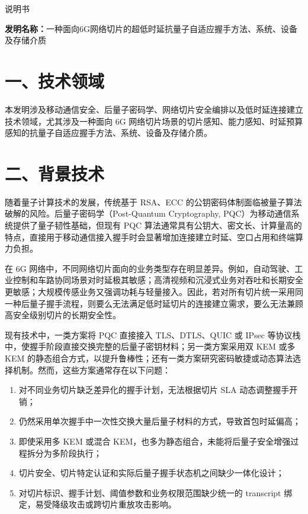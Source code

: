 \documentclass[12pt,a4paper]{article}
\begin{document}
\begin{center}
    {\Huge\heiti 说明书}
\end{center}

\vspace{1em}

\noindent\textbf{发明名称：}一种面向6G网络切片的超低时延抗量子自适应握手方法、系统、设备及存储介质

\section*{一、技术领域}

本发明涉及移动通信安全、后量子密码学、网络切片安全编排以及低时延连接建立技术领域，尤其涉及一种面向 6G 网络切片场景的切片感知、能力感知、时延预算感知的抗量子自适应握手方法、系统、设备及存储介质。

\section*{二、背景技术}

随着量子计算技术的发展，传统基于 RSA、ECC 的公钥密码体制面临被量子算法破解的风险。后量子密码学（Post-Quantum Cryptography, PQC）为移动通信系统提供了量子韧性基础，但现有 PQC 算法通常具有公钥大、密文长、计算量高的特点，直接用于移动通信接入握手时会显著增加连接建立时延、空口占用和终端算力负担。

在 6G 网络中，不同网络切片面向的业务类型存在明显差异。例如，自动驾驶、工业控制和车路协同场景对时延极其敏感；高清视频和沉浸式业务对吞吐和长期安全更敏感；大规模传感业务又强调功耗与轻量接入。因此，若对所有切片统一采用同一种后量子握手流程，则要么无法满足低时延切片的连接建立需求，要么无法兼顾高安全级别切片的长期安全性。

现有技术中，一类方案将 PQC 直接接入 TLS、DTLS、QUIC 或 IPsec 等协议栈中，使握手阶段直接交换完整的后量子密钥材料；另一类方案采用双 KEM 或多 KEM 的静态组合方式，以提升鲁棒性；还有一类方案研究密码敏捷或动态算法选择机制。然而，这些方案通常存在以下问题：

\begin{enumerate}[leftmargin=2em]
    \item 对不同业务切片缺乏差异化的握手计划，无法根据切片 SLA 动态调整握手开销；
    \item 仍然采用单次握手中一次性交换大量后量子材料的方式，导致首包时延偏高；
    \item 即使采用多 KEM 或混合 KEM，也多为静态组合，未能将后量子安全增强过程拆分为多阶段执行；
    \item 切片安全、切片特定认证和实际后量子握手状态机之间缺少一体化设计；
    \item 对切片标识、握手计划、阈值参数和业务权限范围缺少统一的 transcript 绑定，易受降级攻击或跨切片重放攻击影响。
\end{enumerate}
\end{document}
